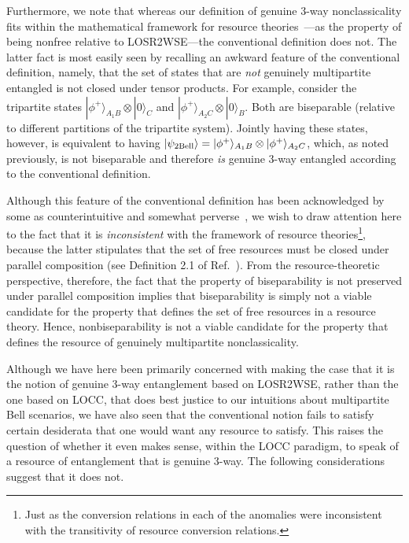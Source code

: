 \documentclass[12pt]{article}
\theoremstyle{plain}
\theoremstyle{definition}
\begin{document}
Furthermore,
 we note that whereas our definition of genuine 3-way nonclassicality 
fits within the mathematical framework for resource theories~\cite{coecke2016mathematical}---as the property of being nonfree relative to LOSR2WSE---the conventional definition does not.  
The latter fact is most easily seen by recalling an awkward feature of the conventional definition,
namely, that the set of states that are {\em not} genuinely multipartite entangled is not closed under tensor products.  For example, consider the tripartite states $|\phi^{+}\rangle_{A_1B} \otimes |0\rangle_C$ and $|\phi^{+}\rangle_{A_2 C} \otimes |0\rangle_B$.  Both are biseparable (relative to different partitions of the tripartite system).  
Jointly having these states, however, is 
equivalent to having $|\psi_{\rm 2Bell}\rangle = |\phi^{+}\rangle_{A_1B} \otimes |\phi^{+}\rangle_{A_2 C}$, which, as noted previously, is not biseparable 
   and therefore {\em is} genuine 3-way entangled according to the conventional definition.  

Although this feature of the conventional definition has been acknowledged by some as counterintuitive and somewhat perverse~\cite{navascues2020genuine,contreras2021,MultipartiteProblem2020Luo}, we wish to draw attention here to the fact that it is {\em inconsistent} with the framework of resource theories\footnote{Just as the conversion relations in each of the anomalies were inconsistent with the transitivity of resource conversion relations.}, because the latter 
 stipulates that the set of free resources must be closed under parallel composition (see Definition 2.1 of Ref.~\cite{coecke2016mathematical}). From the resource-theoretic perspective, therefore, the fact that the property of biseparability is not preserved under parallel composition
  implies that biseparability is simply not a viable candidate for the property that defines the set of free resources in a resource theory. Hence, %
 nonbiseparability is not a viable candidate for the property that defines 
 the resource of genuinely multipartite nonclassicality.
 
Although we have here been primarily concerned with making the case that it is the notion of genuine 3-way entanglement based on  LOSR2WSE, rather than the one based on LOCC, that does best justice to our intuitions about multipartite Bell scenarios,
 we have also seen that the conventional notion fails to satisfy certain desiderata that one would want any resource to satisfy.  This raises the question of whether it even makes sense,  within the LOCC paradigm, to speak of a resource of entanglement that is genuine 3-way.  The following considerations suggest that it does not.
\end{document}
